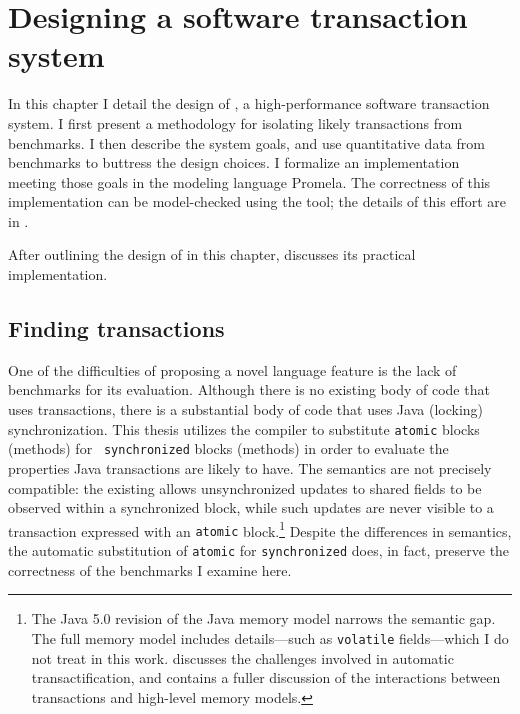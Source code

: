 \chapter{Designing a software transaction system}\label{cha:stm}

In this chapter I detail the design of \apex, a
high-performance software transaction system.  I first present
a methodology for isolating likely transactions from benchmarks.
I then describe the system goals, and use quantitative data from
benchmarks to buttress the design choices.  I formalize an
implementation meeting those goals in the modeling language
Promela.  The correctness of this implementation can be model-checked
using the \Spin tool; the details of this effort are in
.

After outlining the design of \apex in this chapter, 
discusses its practical implementation.

\section{Finding transactions}\label{sec:auto}
One of the difficulties of proposing a novel language feature is the
lack of benchmarks for its evaluation.  Although there is no existing body of
code that uses transactions, there is a substantial body of
code that uses Java (locking) synchronization.  This thesis
utilizes the \flex compiler \cite{Flex} to
substitute {\tt atomic} blocks (methods) for {\tt
  synchronized} blocks (methods) in order to evaluate the properties
Java transactions are likely to have.  The semantics are not
precisely compatible: the existing  allows
unsynchronized updates to shared fields to be observed within a
synchronized block, while such updates are never visible to a
transaction expressed with an
{\tt atomic} block.\footnote{The Java 5.0 revision of the Java memory model
\cite{MansonPu01a,MansonPu01b,MansonPuAd05} narrows the semantic gap.
The full memory model includes details---such as \texttt{volatile}
fields---which I do not treat in this work.  
discusses the challenges involved in automatic transactification, and 
\cite{GrossmanMaPu06} contains a fuller discussion of the interactions
between transactions and high-level memory models.}
Despite the differences in semantics, the automatic substitution of
{\tt atomic} for {\tt synchronized} does, in fact, preserve the
correctness of the benchmarks I examine here.


